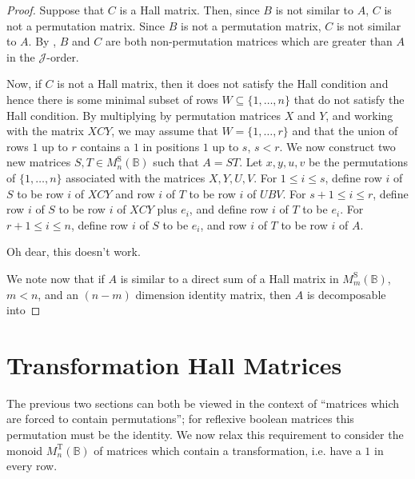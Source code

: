 \documentclass[11pt]{article}
\numberwithin{equation}{section}
\newcommand{\B}{\mathbb{B}}
\newcommand{\Halln}{M_n^{\text{S}}(\B)}
\newcommand{\Hall}[1]{M_{#1}^{\text{S}}(\B)}
\newcommand{\MTn}{M_n^{\text{T}}(\B)}
\newcommand{\J}{\mathscr{J}}
\begin{document}
\begin{proof}
  Suppose that $C$ is a Hall matrix. Then, since $B$ is not similar to $A$, $C$
  is not a permutation matrix.  Since $B$ is not a permutation matrix, $C$ is
  not similar to $A$. By , $B$ and $C$ are both
  non-permutation matrices which are greater than $A$ in the $\J$-order.

  Now, if $C$ is not a Hall matrix, then it does not satisfy the Hall condition
  and hence there is some minimal subset of rows $W \subseteq \{1, \ldots, n \}$
  that do not satisfy the Hall condition. By multiplying by permutation matrices
  $X$ and $Y$, and working with the matrix $XCY$, we may assume that $W = \{1,
    \ldots, r \}$ and that the union of rows $1$ up to $r$ contains a $1$ in
  positions $1$ up to $s$, $s < r$. We now construct two new matrices $S, T \in
  \Halln$ such that $A = ST$. 
  Let $x, y, u, v$ be the permutations of $\{1, \ldots, n \}$ associated with
  the matrices $X, Y, U, V$. For $1 \leq i \leq s$, define row $i$ of $S$ to
  be row $i$ of $XCY$ and row $i$ of $T$ to be row $i$ of $UBV$. For $s + 1 \leq
  i \leq r$, define row $i$ of $S$ to be row $i$ of $XCY$ plus $e_i$, and define
  row $i$ of $T$ to be $e_i$. For $r + 1 \leq i \leq n$, define row $i$ of $S$
  to be $e_i$, and row $i$ of $T$ to be row $i$ of $A$. 
  
  
  Oh dear, this doesn't work.
 

  We note now
  that if $A$ is similar to a direct sum of a Hall matrix in $\Hall{m}$, $m <
  n$, and an $(n-m)$ dimension identity matrix, then $A$ is decomposable into 

\end{proof}

\section{Transformation Hall Matrices}
The previous two sections can both be viewed in the context of ``matrices which
are forced to contain permutations''; for reflexive boolean matrices this
permutation must be the identity. We now relax this requirement to consider the
monoid $\MTn$ of matrices which contain a transformation, i.e. have a $1$ in
every row.
\end{document}
